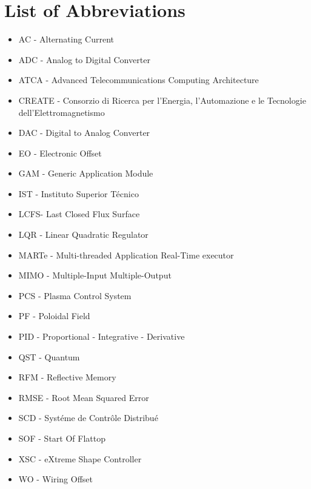 \chapter*{List of Abbreviations}

\begin{itemize}
\item AC - Alternating Current
\item ADC - Analog to Digital Converter
\item ATCA -  Advanced Telecommunications Computing Architecture 
\item CREATE - Consorzio di Ricerca per l'Energia, l'Automazione e le Tecnologie dell'Elettromagnetismo
\item DAC - Digital to Analog Converter
\item EO - Electronic Offset
\item GAM - Generic Application Module 
\item IST - Instituto Superior Técnico 
\item LCFS- Last Closed Flux Surface
\item LQR - Linear Quadratic Regulator
\item MARTe - Multi-threaded Application Real-Time executor
\item MIMO - Multiple-Input Multiple-Output
\item PCS - Plasma Control System
\item PF - Poloidal Field 
\item PID - Proportional - Integrative - Derivative
\item QST - Quantum
\item RFM - Reflective Memory
\item RMSE - Root Mean Squared Error
\item SCD - Syst\'eme de Contr\^ole Distribu\'e
\item SOF - Start Of Flattop
\item XSC - eXtreme Shape Controller
\item WO - Wiring Offset
\end{itemize}


